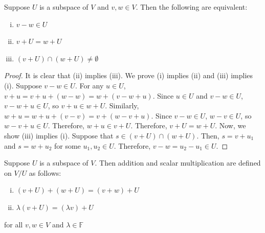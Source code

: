 \documentclass{article}
\begin{document}
\begin{theorem}
  \label{thm:translates-of-subspace-are-equal-or-disjoint}
  Suppose $U$ is a subspace of $V$ and $v, w \in V$. Then the
  following are equivalent:
  \begin{enumerate}[(i)]
  \item $v - w \in U$
  \item $v + U = w + U$
  \item $(v + U) \cap (w + U) \ne \emptyset$
  \end{enumerate}
\end{theorem}
\begin{proof}
  It is clear that (ii) implies (iii). We prove (i) implies (ii) and
  (iii) implies (i). Suppose $v - w \in U$. For any $u \in U$, $v + u
  = v + u + (w - w) = w + (v - w + u)$. Since $u \in U$ and $v - w \in
  U$, $v - w + u \in U$, so $v + u \in w + U$. Similarly, $w + u = w +
  u + (v - v) = v + (w - v + u)$. Since $v - w \in U$, $w - v \in U$,
  so $w - v + u \in U$. Therefore, $w + u \in v + U$. Therefore, $v +
  U = w + U$. Now, we show (iii) implies (i). Suppose that $s \in (v +
  U) \cap (w + U)$. Then, $s = v + u_1$ and $s = w + u_2$ for some
  $u_1, u_2 \in U$. Therefore, $v - w = u_2 - u_1 \in U$.
\end{proof}

\begin{definition}
  \label{def:addition-scalar-multiplication-on-V/W}
  Suppose $U$ is a subspace of $V$. Then addition and scalar
  multiplication are defined on $V/U$ as follows:
  \begin{enumerate}[(i)]
  \item $(v + U) + (w + U) = (v + w) + U$
  \item $\lambda(v + U) = (\lambda v) + U$
  \end{enumerate}
  for all $v, w \in V$ and $\lambda \in \mathbb{F}$
\end{definition}
\end{document}
